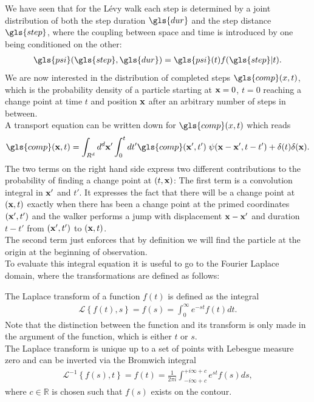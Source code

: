 We have seen that for the L\'evy walk each step is determined by a joint distribution of both the step duration $\gls{dur}$ and the step distance $\gls{step}$, where the coupling between space and time is introduced by one being conditioned on the other:
%
\begin{align}
\gls{psi}(\gls{step}, \gls{dur}) = \gls{psi}(t) f(\gls{step}|t) .
\end{align}
%
We are now interested in the distribution of completed steps $\gls{comp}(x,t)$, which is the probability density of a particle starting at $\mathbf{ x }=0$, $t=0$ reaching a change point at time $t$ and position $\mathbf{ x }$ after an arbitrary number of steps in between. \\
A transport equation can be written down for $\gls{comp}(x,t)$  which reads 
\cite{firstSteps}%
\begin{align}
\gls{comp}(\ve{x},t) = \int_{R^{d}} d^{d}\ve{x}' \int_{0}^{t} dt' \gls{comp}(\ve{x}',t')  \; \psi(\ve{x}-\ve{x}',t-t') + \delta(t) \delta(\ve{x}) . \label{eqn:CTransport}
\end{align}
%
The two terms on the right hand side express two different contributions to the probability of finding a change point at $(t,\mathbf{ x })$: The first term is a convolution integral in $\mathbf{ x' }$ and $t'$. It expresses the fact that there will be a change point at $(\mathbf{ x },t)$ exactly when there has been a change point at the primed coordinates $(\mathbf{ x' },t')$ and the walker performs a jump with displacement $\mathbf{ x }-\mathbf{ x }'$ and duration $t-t'$ from $(\mathbf{ x' },t')$ to $(\mathbf{ x },t)$.  \\
The second term just enforces that by definition we will find the particle at the origin at the beginning of observation. \\
To evaluate this integral equation it is useful to go to the Fourier Laplace domain, where the transformations are defined as follows:

The Laplace transform of a function $f(t)$ is defined as the integral 
%
\begin{align}
\mathcal{L} \left\{ f(t), s \right\} = f(s) = \int^{\infty}_{0} e^{-st} f(t) dt .
\end{align}
%
Note that the distinction between the function and its transform is only made in the argument of the function, which is either $t$ or $s$. \\
The Laplace transform is unique up to a set of points with Lebesgue measure zero and can be inverted via the Bromwich integral 
%
\begin{align}
\mathcal{L}^{-1} \left\{ f(s), t \right\} = f(t) = \frac{1}{2 \pi i} \int^{+i \infty + c}_{-i \infty + c} e^{st} f(s) ds, 
\end{align}
%
where $c \in \mathbb{R}$ is chosen such that $f(s)$ exists on the contour. 

